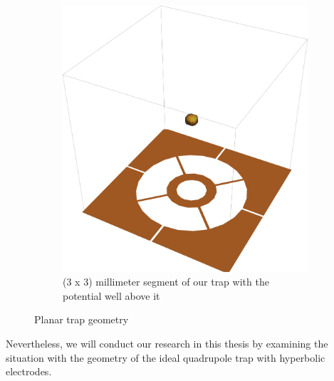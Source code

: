 \begin{figure}[H]
\begin{subfigure}{.5\textwidth}
  \includegraphics[width=\linewidth]{img/real_trap_geometry_2.pdf}  
  \caption{(3 x 3) millimeter segment of our trap with the potential well above it}
  \label{fig:Real trap geometry 2}
\end{subfigure}
\caption{Planar trap geometry}
\label{fig:planar trap geometry}
\end{figure}
Nevertheless, we will conduct our research in this thesis by examining the situation with the geometry of the ideal quadrupole trap with hyperbolic electrodes.

